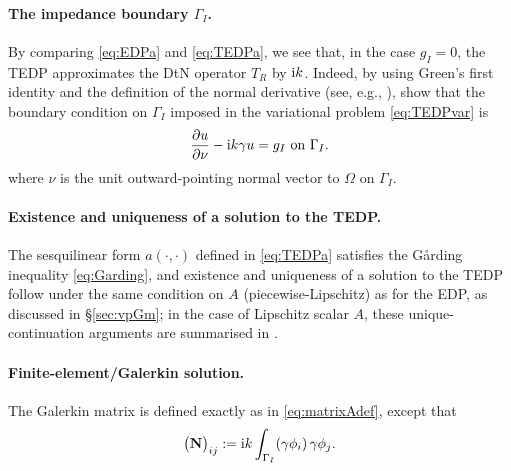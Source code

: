 \documentclass[10pt]{article}%
\numberwithin{equation}{section}
\newcommand{\beq}{\begin{equation}}
\newcommand{\eeq}{\end{equation}}
\newcommand{\ri}{{\rm i}}
\newcommand{\pdiff}[2]{\frac{\partial #1}{\partial #2}}
\newcommand{\Oi}{{\Omega_-}}
\newcommand{\dudnu}{\pdiff{u}{\nu}}
\newcommand{\hout}{(1.5,-2)}
\newcommand{\iin}{(2,-2)}
\newcommand{\ton}{\text{ on }}
\newcommand{\matrixN}{{\bf N}}
\begin{document}
%
%    
%

\paragraph{The impedance boundary $\Gamma_I$.} By comparing \eqref{eq:EDPa} and \eqref{eq:TEDPa}, we see that, in the case $g_I=0$, the TEDP approximates the DtN operator $T_R$ by $\ri k$. Indeed, by using Green's first identity and the definition of the normal derivative (see, e.g., \cite[Lemma 4.3]{Mc:00}), show that the boundary condition on $\Gamma_I$ imposed in the variational problem \eqref{eq:TEDPvar} is 
\beq\label{eq:imp}
\dudnu - \ri k\gamma u = g_I \ton \Gamma_I.
\eeq
where $\nu$ is the unit outward-pointing normal vector to $\Omega$ on $\Gamma_I$.

\paragraph{Existence and uniqueness of a solution to the TEDP.} The sesquilinear form $a(\cdot,\cdot)$ defined in \eqref{eq:TEDPa} satisfies the G\aa rding inequality \eqref{eq:Garding}, and existence and uniqueness of a solution to the TEDP follow under the same condition on $A$ (piecewise-Lipschitz) as for the EDP, as discussed in \S\ref{sec:vpGm}; in the case of Lipschitz scalar $A$, these unique-continuation arguments are summarised in \cite[\S2]{GrSa:18}.

\paragraph{Finite-element/Galerkin solution.}
The Galerkin matrix is defined exactly as in \eqref{eq:matrixAdef}, except that 
\beq\label{eq:NTEDP}
\big(\matrixN\big)_{ij}:= \ri k\int_{\Gamma_I}  (\gamma\phi_i) \,\gamma \phi_j.
\eeq
\end{document}
